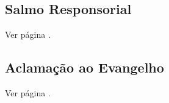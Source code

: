 \label{section:natal/pos-epifania/sabado}

\subsection{Salmo Responsorial}
\begin{center}
  \begin{rubrica}
    Ver página \pageref{subsection:natal/7-janeiro/salmo-responsorial}.
  \end{rubrica}
\end{center}

\subsection{Aclamação ao Evangelho}
\begin{center}
  \begin{rubrica}
    Ver página \pageref{subsection:natal/7-janeiro/aclamacao}.
  \end{rubrica}
\end{center}